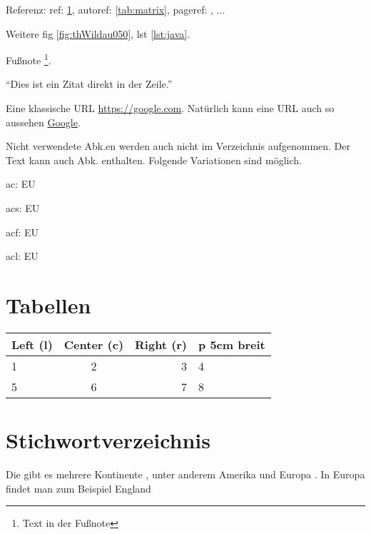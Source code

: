 Referenz: ref: \ref{tab:matrix}, autoref: \autoref{tab:matrix}, pageref: \pageref{tab:matrix}, ...\par

Weitere fig \ref{fig:thWildau050}, lst \ref{lst:java}.\par

Fußnote \footnote{Text in der Fußnote}.\par

\enquote{Dies ist ein Zitat direkt in der Zeile.}\par

Eine klassische URL \url{https://google.com}. %
Natürlich kann eine URL auch so aussehen \href{https://google.com}{Google}.\par

Nicht verwendete \ac{Abk.}en werden auch nicht im Verzeichnis aufgenommen. Der Text kann auch \ac{Abk.} enthalten. Folgende Variationen sind möglich.\par
ac: \ac{EU}\par
acs: \acs{EU}\par
acf: \acf{EU}\par
acl: \acl{EU}\par

\section{Tabellen}\label{sec:tabellen}

\begin{table}[htp]
	\centering
	\begin{tabular}{ | l | c | r | p{5cm} | }
		\hline
		\textbf{Left (l)} & \textbf{Center (c)} & \textbf{Right (r)} & \textbf{p 5cm breit}\\
		\hline
		1 & 2 & 3 & 4\\
		\hline
		5 & 6 & 7 & 8\\
		\hline
	\end{tabular}
	\label{tab:matrix}
\end{table}

\section{Stichwortverzeichnis}\label{sec:idx}

Die  gibt es 
mehrere Kontinente , 
unter anderem Amerika 
 und 
Europa . 
In Europa findet man zum Beispiel 
England 

